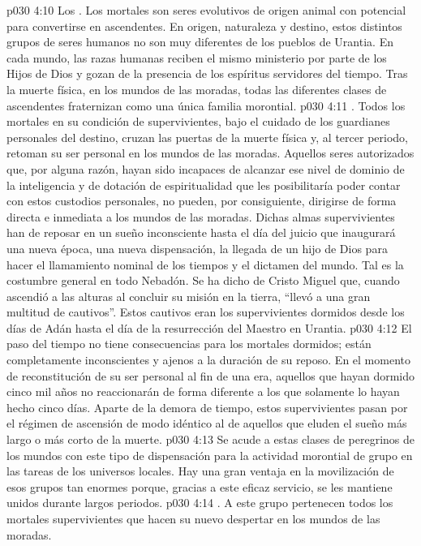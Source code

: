 \vs p030 4:10 Los . Los mortales son seres evolutivos de origen animal con potencial para convertirse en ascendentes. En origen, naturaleza y destino, estos distintos grupos de seres humanos no son muy diferentes de los pueblos de Urantia. En cada mundo, las razas humanas reciben el mismo ministerio por parte de los Hijos de Dios y gozan de la presencia de los espíritus servidores del tiempo. Tras la muerte física, en los mundos de las moradas, todas las diferentes clases de ascendentes fraternizan como una única familia morontial.
\vs p030 4:11 . Todos los mortales en su condición de supervivientes, bajo el cuidado de los guardianes personales del destino, cruzan las puertas de la muerte física y, al tercer periodo, retoman su ser personal en los mundos de las moradas. Aquellos seres autorizados que, por alguna razón, hayan sido incapaces de alcanzar ese nivel de dominio de la inteligencia y de dotación de espiritualidad que les posibilitaría poder contar con estos custodios personales, no pueden, por consiguiente, dirigirse de forma directa e inmediata a los mundos de las moradas. Dichas almas supervivientes han de reposar en un sueño inconsciente hasta el día del juicio que inaugurará una nueva época, una nueva dispensación, la llegada de un hijo de Dios para hacer el llamamiento nominal de los tiempos y el dictamen del mundo. Tal es la costumbre general en todo Nebadón. Se ha dicho de Cristo Miguel que, cuando ascendió a las alturas al concluir su misión en la tierra, “llevó a una gran multitud de cautivos”. Estos cautivos eran los supervivientes dormidos desde los días de Adán hasta el día de la resurrección del Maestro en Urantia.
\vs p030 4:12 El paso del tiempo no tiene consecuencias para los mortales dormidos; están completamente inconscientes y ajenos a la duración de su reposo. En el momento de reconstitución de su ser personal al fin de una era, aquellos que hayan dormido cinco mil años no reaccionarán de forma diferente a los que solamente lo hayan hecho cinco días. Aparte de la demora de tiempo, estos supervivientes pasan por el régimen de ascensión de modo idéntico al de aquellos que eluden el sueño más largo o más corto de la muerte.
\vs p030 4:13 Se acude a estas clases de peregrinos de los mundos con este tipo de dispensación para la actividad morontial de grupo en las tareas de los universos locales. Hay una gran ventaja en la movilización de esos grupos tan enormes porque, gracias a este eficaz servicio, se les mantiene unidos durante largos periodos.
\vs p030 4:14 . A este grupo pertenecen todos los mortales supervivientes que hacen su nuevo despertar en los mundos de las moradas.
